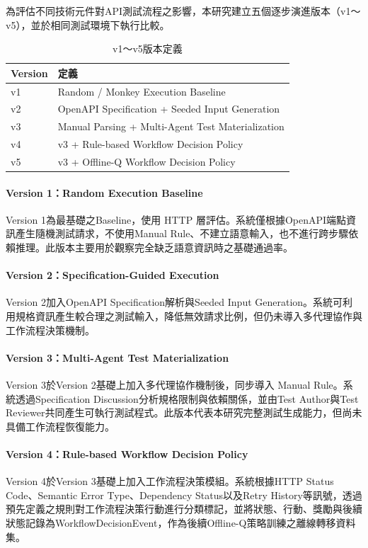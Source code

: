 \begin{ZhChapter}
\text 為評估不同技術元件對API測試流程之影響，本研究建立五個逐步演進版本（v1～v5），並於相同測試環境下執行比較。
\begin{table}[H]
\centering
\caption{v1～v5版本定義}
\label{tab:version_definition}
\renewcommand{\arraystretch}{1.3}
\begin{tabular}{p{1.5cm} p{10cm}}
\toprule
\textbf{Version} & \textbf{定義} \\
\midrule
v1 & Random / Monkey Execution Baseline \\
v2 & OpenAPI Specification + Seeded Input Generation \\
v3 & Manual Parsing + Multi-Agent Test Materialization \\
v4 & v3 + Rule-based Workflow Decision Policy \\
v5 & v3 + Offline-Q Workflow Decision Policy \\
\bottomrule
\end{tabular}
\end{table}

\paragraph{Version 1：Random Execution Baseline}
\text Version 1為最基礎之Baseline，使用 HTTP 層評估。系統僅根據OpenAPI端點資訊產生隨機測試請求，不使用Manual Rule、不建立語意輸入，也不進行跨步驟依賴推理。此版本主要用於觀察完全缺乏語意資訊時之基礎通過率。
\paragraph{Version 2：Specification-Guided Execution}
\text Version 2加入OpenAPI Specification解析與Seeded Input Generation。系統可利用規格資訊產生較合理之測試輸入，降低無效請求比例，但仍未導入多代理協作與工作流程決策機制。
\paragraph{Version 3：Multi-Agent Test Materialization}
\text Version 3於Version 2基礎上加入多代理協作機制後，同步導入 Manual Rule。系統透過Specification Discussion分析規格限制與依賴關係，並由Test Author與Test Reviewer共同產生可執行測試程式。此版本代表本研究完整測試生成能力，但尚未具備工作流程恢復能力。
\paragraph{Version 4：Rule-based Workflow Decision Policy}
\text Version 4於Version 3基礎上加入工作流程決策模組。系統根據HTTP Status Code、Semantic Error Type、Dependency Status以及Retry History等訊號，透過預先定義之規則對工作流程決策行動進行分類標記，並將狀態、行動、獎勵與後續狀態記錄為WorkflowDecisionEvent，作為後續Offline-Q策略訓練之離線轉移資料集。

\end{ZhChapter}
